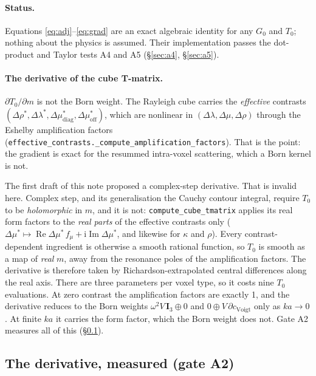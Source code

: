 \documentclass[11pt,a4paper]{article}
\newcommand{\ii}{\mathrm{i}}
\newcommand{\Tz}{T_0}
\newcommand{\Gz}{G_0}
\newcommand{\bI}{\mathbf{I}}
\begin{document}
\paragraph{Status.} Equations \eqref{eq:adj}--\eqref{eq:grad} are an exact algebraic identity for
any $\Gz$ and $\Tz$; nothing about the physics is assumed. Their implementation passes the
dot-product and Taylor tests A4 and A5 (\S\ref{sec:a4}, \S\ref{sec:a5}).

\paragraph{The derivative of the cube T-matrix.} $\partial\Tz/\partial m$ is not the Born weight.
The Rayleigh cube carries the \emph{effective} contrasts
$(\Delta\rho^*,\Delta\lambda^*,\Delta\mu^*_{\mathrm{diag}},\Delta\mu^*_{\mathrm{off}})$, which
are nonlinear in $(\Delta\lambda,\Delta\mu,\Delta\rho)$ through the Eshelby amplification factors
(\nolinkurl{effective_contrasts._compute_amplification_factors}). That is the point: the
gradient is exact for the resummed intra-voxel scattering, which a Born kernel is not.

The first draft of this note proposed a complex-step derivative. That is invalid here. Complex
step, and its generalisation the Cauchy contour integral, require $\Tz$ to be
\emph{holomorphic} in $m$, and it is not: \nolinkurl{compute_cube_tmatrix} applies its real form
factors to the \emph{real parts} of the effective contrasts only
($\Delta\mu^* \mapsto \operatorname{Re}\Delta\mu^*\,f_\mu + \ii\operatorname{Im}\Delta\mu^*$, and
likewise for $\kappa$ and $\rho$). Every contrast-dependent ingredient is otherwise a smooth
rational function, so $\Tz$ is smooth as a map of \emph{real} $m$, away from the resonance poles of
the amplification factors. The derivative is therefore taken by Richardson-extrapolated central
differences along the real axis. There are three parameters per voxel type, so it costs nine $\Tz$
evaluations. At zero contrast the amplification factors are exactly 1, and the derivative
reduces to the Born weights $\omega^2V\,\bI_3\oplus0$ and $0\oplus V\,\partial c_{\mathrm{Voigt}}$
only as $ka\to0$. At finite $ka$ it carries the form factor, which the Born weight does not.
Gate A2 measures all of this (\S\ref{sec:a2}).

\subsection{The derivative, measured (gate A2)}\label{sec:a2}
\end{document}
